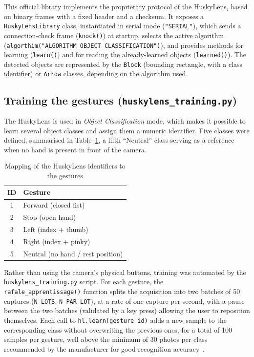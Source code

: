 \documentclass[12pt,a4paper]{report}
\begin{document}
	This official library implements the proprietary protocol of the HuskyLens, based on binary frames with a fixed header and a checksum. It exposes a \texttt{HuskyLensLibrary} class, instantiated in serial mode (\texttt{"SERIAL"}), which sends a connection-check frame (\texttt{knock()}) at startup, selects the active algorithm \\ (\texttt{algorthim("ALGORITHM\_OBJECT\_CLASSIFICATION")}), and provides methods for learning (\texttt{learn()}) and for reading the already-learned objects (\texttt{learned()}). The detected objects are represented by the \texttt{Block} (bounding rectangle, with a class identifier) or \texttt{Arrow} classes, depending on the algorithm used.
	
	\subsection*{Training the gestures (\texttt{huskylens\_training.py})}
	
	The HuskyLens is used in \textit{Object Classification} mode, which makes it possible to learn several object classes and assign them a numeric identifier. Five classes were defined, summarised in Table~\ref{tab:husky-mapping}, a fifth ``Neutral'' class serving as a reference when no hand is present in front of the camera.
	
	\begin{table}[H]
		\centering
		\begin{tabular}{cl}
			\toprule
			\textbf{ID} & \textbf{Gesture} \\
			\midrule
			1 & Forward (closed fist) \\
			2 & Stop (open hand) \\
			3 & Left (index + thumb) \\
			4 & Right (index + pinky) \\
			5 & Neutral (no hand / rest position) \\
			\bottomrule
		\end{tabular}
		\caption{Mapping of the HuskyLens identifiers to the gestures}
		\label{tab:husky-mapping}
	\end{table}
	
	Rather than using the camera's physical buttons, training was automated by the \\ \texttt{huskylens\_training.py} script. For each gesture, the \\ \texttt{rafale\_apprentissage()} function splits the acquisition into two batches of 50 captures (\texttt{N\_LOTS}, \texttt{N\_PAR\_LOT}), at a rate of one capture per second, with a pause between the two batches (validated by a key press) allowing the user to reposition themselves. Each call to \texttt{hl.learn(gesture\_id)} adds a new sample to the corresponding class without overwriting the previous ones, for a total of 100 samples per gesture, well above the minimum of 30 photos per class recommended by the manufacturer for good recognition accuracy~\cite{dfrobot_huskylens}.
	
\end{document}
